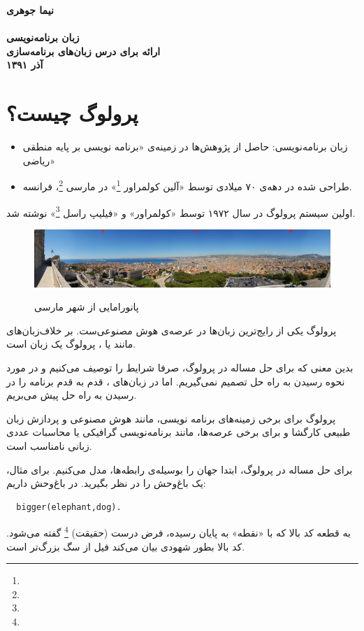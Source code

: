 \documentclass{article}
\begin{document}
\setcounter{section}{0}
{
\noindent
\Large \bf نیما جوهری \\ \vspace{2cm} \\
زبان برنامه‌نویسی 
\\
ارائه برای درس زبان‌های برنامه‌سازی
\\
آذر ۱۳۹۱
}
\clearpage
\section{پرولوگ چیست؟}
\begin{itemize}
  \item زبان برنامه‌نویسی: حاصل از پژوهش‌ها در زمینه‌ی «برنامه نویسی بر پایه منطقی ریاضی»
  \item طراحی شده در دهه‌ی ۷۰ میلادی توسط
    «آلین کولمراور \footnote{}» در مارسی \footnote{}، فرانسه.
\end{itemize}
اولین سیستم پرولوگ در سال ۱۹۷۲ توسط «کولمراور» و
«فیلیپ راسل \footnote{}» نوشته شد.

\begin{figure}[!h]
  \begin{center}
    {\includegraphics[width=12cm]{marseille.jpg}}
  \end{center}
  \caption{پانورامایی از شهر مارسی}
\end{figure}

\clearpage
\noindent پرولوگ یکی از رایج‌ترین زبان‌ها در عرصه‌ی هوش مصنوعی‌ست. بر خلاف‌زبان‌های 
مانند  یا ، پرولوگ یک زبان  است.

بدین معنی که برای حل مساله در پرولوگ، صرفا شرایط را توصیف می‌کنیم و در مورد نحوه
رسیدن به راه حل تصمیم نمی‌گیریم.
اما در زبان‌های ، قدم به قدم برنامه را در رسیدن به راه حل پیش می‌بریم.

پرولوگ برای برخی زمینه‌های برنامه نویسی، مانند هوش مصنوعی و پردازش زبان طبیعی
کارگشا و برای برخی عرصه‌ها، مانند برنامه‌نویسی گرافیکی یا محاسبات عددی زبانی نامناسب است.

برای حل مساله در پرولوگ، ابتدا جهان را بوسیله‌ی رابطه‌ها، مدل می‌کنیم.
برای مثال، یک باغ‌وحش را در نظر بگیرید. در باغ‌وحش داریم:
\begin{verbatim}
  bigger(elephant,dog).
\end{verbatim}
به قطعه کد بالا که با «نقطه» به پایان رسیده، فرض درست (حقیقت) \footnote{} گفته می‌شود.
کد بالا بطور شهودی بیان می‌کند فیل از سگ بزرگ‌تر است.
\end{document}
